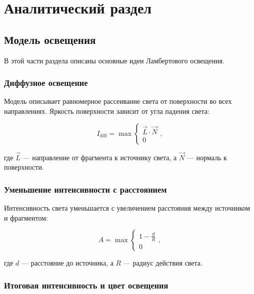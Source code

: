 \chapter{Аналитический раздел}

\section{Модель освещения}

В этой части раздела описаны основные идеи Ламбертового освещения.~\cite{OpenGL_DevidVolf}

\subsection*{Диффузное освещение}

Модель описывает равномерное рассеивание света от поверхности во всех направлениях.
Яркость поверхности зависит от угла падения света:

\begin{equation}
    \label{equ:diffuse_lambert}
    I_{\text{diff}} = \max
    \begin{cases}
        \vec{L} \cdot \vec{N} \\
        0
    \end{cases},
\end{equation}

\noindent где \( \vec{L} \) — направление от фрагмента к источнику света,
а \( \vec{N} \) — нормаль к поверхности.

\subsection*{Уменьшение интенсивности с расстоянием}

Интенсивность света уменьшается с увеличением расстояния между источником и фрагментом:

\begin{equation}
    \label{equ:atteunation_lambert}
    A = \max
    \begin{cases}
        1 - \frac{d}{R} \\
        0
    \end{cases},
\end{equation}

\noindent где \( d \) — расстояние до источника, а \( R \) — радиус действия света.

\subsection*{Итоговая интенсивность и цвет освещения}

